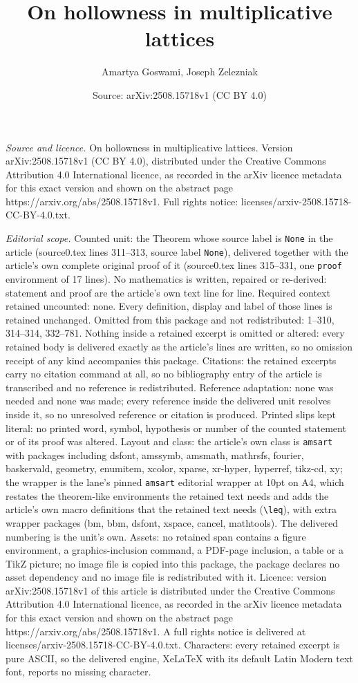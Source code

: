 \documentclass[10pt,a4paper]{amsart}
\title[On hollowness in multiplicative lattices]{On hollowness in multiplicative lattices}
\author{Amartya Goswami, Joseph Zelezniak}
\date{Source: arXiv:2508.15718v1 (CC BY 4.0)}
\begin{document}
\maketitle

\noindent\emph{Source and licence.} On hollowness in multiplicative lattices. Version arXiv:2508.15718v1 (CC BY 4.0), distributed under the Creative Commons Attribution 4.0 International licence, as recorded in the arXiv licence metadata for this exact version and shown on the abstract page https://arxiv.org/abs/2508.15718v1. Full rights notice: licenses/arxiv-2508.15718-CC-BY-4.0.txt.\par\smallskip

\noindent\textit{Editorial scope.} Counted unit: the Theorem whose source label is \texttt{None} in the article (source0.tex lines 311--313, source label \texttt{None}), delivered together with the article's own complete original proof of it (source0.tex lines 315--331, one \texttt{proof} environment of 17 lines). No mathematics is written, repaired or re-derived: statement and proof are the article's own text line for line. Required context retained uncounted: none. Every definition, display and label of those lines is retained unchanged. Omitted from this package and not redistributed: 1--310, 314--314, 332--781. Nothing inside a retained excerpt is omitted or altered: every retained body is delivered exactly as the article's lines are written, so no omission receipt of any kind accompanies this package. Citations: the retained excerpts carry no citation command at all, so no bibliography entry of the article is transcribed and no reference is redistributed. Reference adaptation: none was needed and none was made; every reference inside the delivered unit resolves inside it, so no unresolved reference or citation is produced. Printed slips kept literal: no printed word, symbol, hypothesis or number of the counted statement or of its proof was altered. Layout and class: the article's own class is \texttt{amsart} with packages including dsfont, amssymb, amsmath, mathrsfs, fourier, baskervald, geometry, enumitem, xcolor, xparse, xr-hyper, hyperref, tikz-cd, xy; the wrapper is the lane's pinned \texttt{amsart} editorial wrapper at 10pt on A4, which restates the theorem-like environments the retained text needs and adds the article's own macro definitions that the retained text needs (\texttt{\textbackslash leq}), with extra wrapper packages (bm, bbm, dsfont, xspace, cancel, mathtools). The delivered numbering is the unit's own. Assets: no retained span contains a figure environment, a graphics-inclusion command, a PDF-page inclusion, a table or a TikZ picture; no image file is copied into this package, the package declares no asset dependency and no image file is redistributed with it. Licence: version arXiv:2508.15718v1 of this article is distributed under the Creative Commons Attribution 4.0 International licence, as recorded in the arXiv licence metadata for this exact version and shown on the abstract page https://arxiv.org/abs/2508.15718v1. A full rights notice is delivered at licenses/arxiv-2508.15718-CC-BY-4.0.txt. Characters: every retained excerpt is pure ASCII, so the delivered engine, XeLaTeX with its default Latin Modern text font, reports no missing character.
\end{document}
